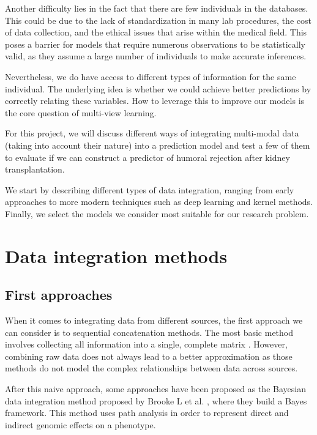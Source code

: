\documentclass[11pt,a4paper]{article}
\begin{document}
Another difficulty lies in the fact that there are few individuals in the databases. This could be due to the lack of standardization in many lab procedures, the cost of data collection, and the ethical issues that arise within the medical field. This poses a barrier for models that require numerous observations to be statistically valid, as they assume a large number of individuals to make accurate inferences.

Nevertheless, we do have access to different types of information for the same individual. The underlying idea is whether we could achieve better predictions by correctly relating these variables. How to leverage this to improve our models is the core question of multi-view learning.

For this project, we will discuss different ways of integrating multi-modal data (taking into account their nature) into a prediction model and test a few of them to evaluate if we can construct a predictor of humoral rejection after kidney transplantation.

We start by describing different types of data integration, ranging from early approaches to more modern techniques such as deep learning and kernel methods. Finally, we select the models we consider most suitable for our research problem.

\section{Data integration methods}

\subsection{First approaches}

When it comes to integrating data from different sources, the first approach we can consider is to sequential concatenation methods. The most basic method involves collecting all information into a single, complete matrix \cite{chen2023multiomics}. However, combining raw data does not always lead to a better approximation as those methods do not model the complex relationships between data across sources.

After this naive approach, some approaches have been proposed as the Bayesian data integration method proposed by Brooke L et al. \cite{fridley2012bayesian}, where they build a Bayes framework. This method uses path analysis in order to represent direct and indirect genomic effects on a phenotype. 
\end{document}
